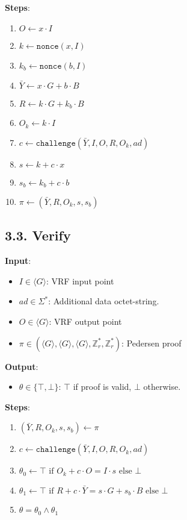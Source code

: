 \documentclass[
]{article}
\providecommand{\tightlist}{%
  \setlength{\itemsep}{0pt}\setlength{\parskip}{0pt}}
\begin{document}
\textbf{Steps}:

\begin{enumerate}
\def\labelenumi{\arabic{enumi}.}
\tightlist
\item
  \(O \gets x \cdot I\)
\item
  \(k \gets \texttt{nonce}(x, I)\)
\item
  \(k_b \gets \texttt{nonce}(b, I)\)
\item
  \(\bar{Y} \gets x \cdot G + b \cdot B\)
\item
  \(R \gets k \cdot G + k_b \cdot B\)
\item
  \(O_k \gets k \cdot I\)
\item
  \(c \gets \texttt{challenge}(\bar{Y}, I, O, R, O_k, ad)\)
\item
  \(s \gets k + c \cdot x\)
\item
  \(s_b \gets k_b + c \cdot b\)
\item
  \(\pi \gets (\bar{Y}, R, O_k, s, s_b)\)
\end{enumerate}

\subsection{3.3. Verify}\label{verify-1}

\textbf{Input}:

\begin{itemize}
\tightlist
\item
  \(I \in \langle G \rangle\): VRF input point
\item
  \(ad \in \Sigma^*\): Additional data octet-string.
\item
  \(O \in \langle G \rangle\): VRF output point
\item
  \(\pi \in (\langle G \rangle, \langle G \rangle, \langle G \rangle, \mathbb{Z}^*_r, \mathbb{Z}^*_r)\):
  Pedersen proof
\end{itemize}

\textbf{Output}:

\begin{itemize}
\tightlist
\item
  \(\theta \in \{ \top, \bot \}\): \(\top\) if proof is valid, \(\bot\)
  otherwise.
\end{itemize}

\textbf{Steps}:

\begin{enumerate}
\def\labelenumi{\arabic{enumi}.}
\tightlist
\item
  \((\bar{Y}, R, O_k, s, s_b) \gets \pi\)
\item
  \(c \gets \texttt{challenge}(\bar{Y}, I, O, R, O_k, ad)\)
\item
  \(\theta_0 \gets \top \text{ if } O_k + c \cdot O = I \cdot s \text{ else } \bot\)
\item
  \(\theta_1 \gets \top \text{ if } R + c \cdot \bar{Y} = s \cdot G + s_b \cdot B \text{ else } \bot\)
\item
  \(\theta = \theta_0 \land \theta_1\)
\end{enumerate}
\end{document}
